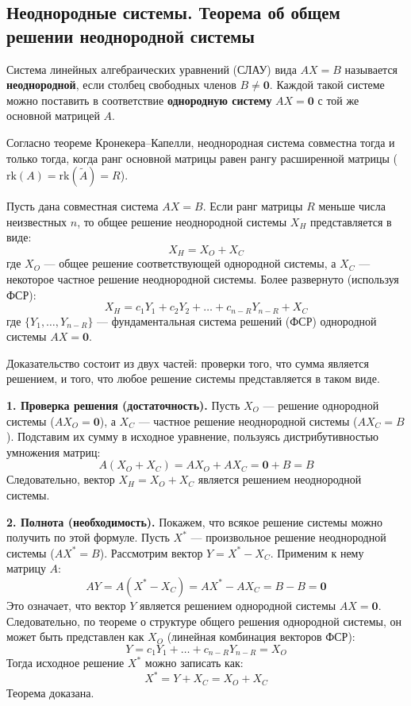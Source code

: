 \subsection{Неоднородные системы. Теорема об общем решении неоднородной системы}

\begin{definition}
Система линейных алгебраических уравнений (СЛАУ) вида $AX = B$ называется \textbf{неоднородной}, если столбец свободных членов $B \neq \mathbf{0}$. Каждой такой системе можно поставить в соответствие \textbf{однородную систему} $AX = \mathbf{0}$ с той же основной матрицей $A$.
\end{definition}

Согласно теореме Кронекера--Капелли, неоднородная система совместна тогда и только тогда, когда ранг основной матрицы равен рангу расширенной матрицы ($\mathrm{rk}(A) = \mathrm{rk}(\tilde{A}) = R$).

\begin{theorem}
Пусть дана совместная система $AX = B$. Если ранг матрицы $R$ меньше числа неизвестных $n$, то общее решение неоднородной системы $X_H$ представляется в виде:
\[ X_H = X_O + X_C \]
где $X_O$ — общее решение соответствующей однородной системы, а $X_C$ — некоторое частное решение неоднородной системы. 
Более развернуто (используя ФСР):
\[ X_H = c_1 Y_1 + c_2 Y_2 + \dots + c_{n-R} Y_{n-R} + X_C \]
где $\{Y_1, \dots, Y_{n-R}\}$ — фундаментальная система решений (ФСР) однородной системы $AX = \mathbf{0}$.
\end{theorem}

\begin{tcolorbox}[title=Доказательство, breakable]
Доказательство состоит из двух частей: проверки того, что сумма является решением, и того, что любое решение системы представляется в таком виде.

\textbf{1. Проверка решения (достаточность).}
Пусть $X_O$ — решение однородной системы ($AX_O = \mathbf{0}$), а $X_C$ — частное решение неоднородной системы ($AX_C = B$). Подставим их сумму в исходное уравнение, пользуясь дистрибутивностью умножения матриц:
\[ A(X_O + X_C) = AX_O + AX_C = \mathbf{0} + B = B \]
Следовательно, вектор $X_H = X_O + X_C$ является решением неоднородной системы.

\textbf{2. Полнота (необходимость).}
Покажем, что всякое решение системы можно получить по этой формуле. Пусть $X^*$ — произвольное решение неоднородной системы ($AX^* = B$). Рассмотрим вектор $Y = X^* - X_C$. Применим к нему матрицу $A$:
\[ AY = A(X^* - X_C) = AX^* - AX_C = B - B = \mathbf{0} \]
Это означает, что вектор $Y$ является решением однородной системы $AX = \mathbf{0}$. Следовательно, по теореме о структуре общего решения однородной системы, он может быть представлен как $X_O$ (линейная комбинация векторов ФСР):
\[ Y = c_1 Y_1 + \dots + c_{n-R} Y_{n-R} = X_O \]
Тогда исходное решение $X^*$ можно записать как:
\[ X^* = Y + X_C = X_O + X_C \]
Теорема доказана.
\end{tcolorbox}

